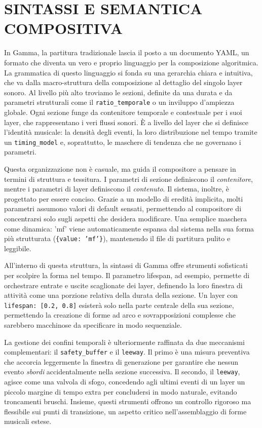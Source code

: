 
\section{SINTASSI E SEMANTICA COMPOSITIVA}
In Gamma, la partitura tradizionale lascia il posto a un documento YAML, un formato che diventa un vero e proprio linguaggio per la composizione algoritmica.
La grammatica di questo linguaggio si fonda su una gerarchia chiara e intuitiva, che va dalla macro-struttura della composizione al dettaglio del singolo layer sonoro. Al livello più alto troviamo le sezioni, definite da una durata e da parametri strutturali come il \texttt{ratio\_temporale} o un inviluppo d'ampiezza globale. Ogni sezione funge da contenitore temporale e contestuale per i suoi layer, che rappresentano i veri flussi sonori. È a livello del layer che si definisce l'identità musicale: la densità degli eventi, la loro distribuzione nel tempo tramite un \texttt{timing\_model} e, soprattutto, le maschere di tendenza che ne governano i parametri.

Questa organizzazione non è casuale, ma guida il compositore a pensare in termini di struttura e tessitura. I parametri di sezione definiscono il \textit{contenitore}, mentre i parametri di layer definiscono il \textit{contenuto}. Il sistema, inoltre, è progettato per essere conciso. Grazie a un modello di eredità implicita, molti parametri assumono valori di default sensati, permettendo al compositore di concentrarsi solo sugli aspetti che desidera modificare. Una semplice maschera come dinamica: 'mf' viene automaticamente espansa dal sistema nella sua forma più strutturata (\texttt{\{value: 'mf'\}}), mantenendo il file di partitura pulito e leggibile.

All'interno di questa struttura, la sintassi di Gamma offre strumenti sofisticati per scolpire la forma nel tempo. Il parametro lifespan, ad esempio, permette di orchestrare entrate e uscite scaglionate dei layer, definendo la loro finestra di attività come una porzione relativa della durata della sezione. Un layer con \texttt{lifespan: [0.2, 0.8]} esisterà solo nella parte centrale della sua sezione, permettendo la creazione di forme ad arco e sovrapposizioni complesse che sarebbero macchinose da specificare in modo sequenziale.

La gestione dei confini temporali è ulteriormente raffinata da due meccanismi complementari: il \texttt{safety\_buffer} e il \texttt{leeway}. Il primo è una misura preventiva che accorcia leggermente la finestra di generazione per garantire che nessun evento \textit{sbordi} accidentalmente nella sezione successiva. Il secondo, il \texttt{leeway}, agisce come una valvola di sfogo, concedendo agli ultimi eventi di un layer un piccolo margine di tempo extra per concludersi in modo naturale, evitando troncamenti bruschi. Insieme, questi strumenti offrono un controllo rigoroso ma flessibile sui punti di transizione, un aspetto critico nell'assemblaggio di forme musicali estese.

